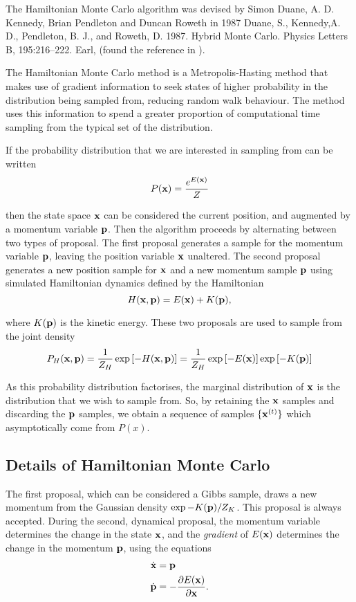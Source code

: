 \documentclass{amsart}[12pt]
\begin{document}
The Hamiltonian Monte Carlo algorithm was devised by Simon Duane, A. D. Kennedy, Brian Pendleton and Duncan
Roweth in 1987 
Duane, S., Kennedy,A. D., Pendleton, B. J., and Roweth, D. 1987. Hybrid Monte Carlo. Physics Letters B, 195:216–222.
Earl,
(found the reference in \cite{Neal2011}).

The Hamiltonian Monte Carlo method is a Metropolis-Hasting method that makes use of gradient information to
seek states of higher probability in the distribution being sampled from, reducing random walk behaviour. The method uses this information to spend a greater proportion of computational time sampling from the typical set of 
the distribution.

If the probability distribution that we are interested in sampling from can be written
\[
	P({\bf x}) = \frac{e^{E({\bf x})}}{Z}
\]

then the state space ${\bf x}$ can be considered the current position, and augmented by a momentum variable
${\bf p}$. Then the algorithm proceeds by alternating between two types of proposal. The first proposal generates
a sample for the momentum variable ${\bf p}$, leaving the position variable ${\bf x}$ unaltered. The second proposal
generates a new position sample for ${\bf x}$ and a new momentum sample ${\bf p}$ using simulated Hamiltonian dynamics
defined by the Hamiltonian
\[
	H({\bf x}, {\bf p}) = E({\bf x}) + K({\bf p}),
\]

where $K({\bf p})$ is the kinetic energy. These two proposals are used to sample from the joint density
\[
	P_H({\bf x}, {\bf p}) = \frac{1}{Z_H} \exp{[-H({\bf x}, {\bf p})]} = \frac{1}{Z_H} \exp{[-E({\bf x})]} \exp{[ -K({\bf p})]}
\]

As this probability distribution factorises, the marginal distribution of ${\bf x}$ is the distribution that we
wish to sample from. So, by retaining the ${\bf x}$ samples and discarding the ${\bf p}$ samples, we obtain a sequence
of samples $\{ {\bf x}^{(t)} \}$ which asymptotically come from $P(x)$.

\subsection{Details of Hamiltonian Monte Carlo}

The first proposal, which can be considered a Gibbs sample, draws a new momentum from the Gaussian density
$\exp{-K({\bf p})}/Z_K$. This proposal is always accepted. During the second, dynamical proposal, the momentum
variable determines the change in the state ${\bf x}$, and the \emph{gradient} of $E({\bf x})$ determines the change
in the momentum ${\bf p}$, using the equations
\begin{align*}
\dot{{\bf x}} &= {\bf p} \\
\dot{{\bf p}} &= -\frac{\partial E({\bf x})}{\partial {\bf x}}.
\end{align*}
\end{document}
